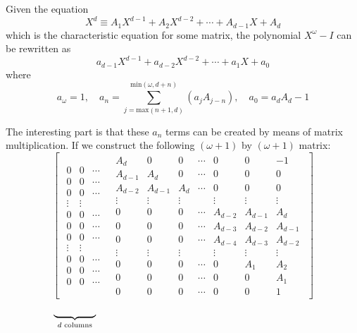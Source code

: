\documentclass[a4paper, 12pt, reqno]{amsart}
\begin{document}
			Given the equation
			\[
				X^d \equiv A_{1}X^{d-1} + A_{2}X^{d-2} + \cdots + A_{d-1}X + A_d
			\]
			which is the characteristic equation for some matrix, the polynomial $X^{\omega} - I$ can be rewritten as
			\[
				a_{d-1}X^{d-1} + a_{d-2}X^{d-2} + \cdots + a_{1}X + a_0
			\]
			where
			\[
				a_{\omega} = 1, \quad 
				a_n = \sum_{j=\text{max}(n+1, d)}^{\text{min}(\omega, d+n)} (a_{j}A_{j-n}), \quad
				a_0 = a_{d}A_{d} - 1
			\]
			
			The interesting part is that these $a_n$ terms can be created by means of matrix multiplication. If we construct
			the following $(\omega + 1)$ by $(\omega + 1)$ matrix:
			\[
				\begin{bmatrix}
					\begin{matrix} %
						0      & 0      & \cdots \\ 
						0      & 0      & \cdots \\
						0      & 0      & \cdots \\ 
						\vdots & \vdots &        \\ 
						0      & 0      & \cdots \\ 
						0      & 0      & \cdots \\ 
						0      & 0      & \cdots \\ 
						\vdots & \vdots          \\
						0      & 0      & \cdots \\ 
						0      & 0      & \cdots \\ 
						0      & 0      & \cdots 
					\end{matrix} & 
					\begin{matrix} %
						A_{d}   & 0       & 0       & \cdots & 0       & 0       & -1      \\
						A_{d-1} & A_{d}   & 0       & \cdots & 0       & 0       & 0       \\
						A_{d-2} & A_{d-1} & A_{d}   & \cdots & 0       & 0       & 0       \\
						\vdots  & \vdots  & \vdots  &        & \vdots  & \vdots  & \vdots  \\
						0       & 0       & 0       & \cdots & A_{d-2} & A_{d-1} & A_{d}   \\
						0       & 0       & 0       & \cdots & A_{d-3} & A_{d-2} & A_{d-1} \\
						0       & 0       & 0       & \cdots & A_{d-4} & A_{d-3} & A_{d-2} \\
						\vdots  & \vdots  & \vdots  &        & \vdots  & \vdots  & \vdots  \\
						0       & 0       & 0       & \cdots & 0       & A_{1}   & A_{2}   \\
						0       & 0       & 0       & \cdots & 0       & 0       & A_{1}   \\
						0       & 0       & 0       & \cdots & 0       & 0       & 1       
					\end{matrix}
				\end{bmatrix}
			\]
			\vspace{-0.8cm}
			\[ %
				\underbrace{\hspace{1.5cm}}_{d \text{ columns}}
				\hspace{7.7cm}
			\]
			
\end{document}
